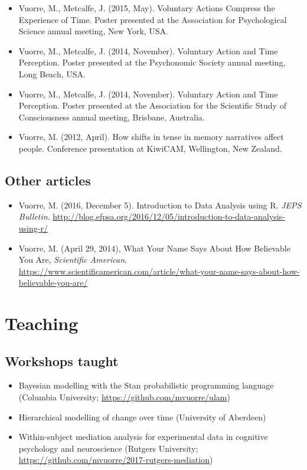 \documentclass[12pt, a4paper]{article}
\newcommand{\years}[1]{\marginnote{\scriptsize #1}}
\begin{document}
\begin{itemize}
\item Vuorre, M., Metcalfe, J. (2015, May). Voluntary Actions Compress the Experience of Time. Poster presented at the Association for Psychological Science annual meeting, New York, USA.
\item \years{2014} Vuorre, M., Metcalfe, J. (2014, November). Voluntary Action and Time Perception. Poster presented at the Psychonomic Society annual meeting, Long Beach, USA.
\item Vuorre, M., Metcalfe, J. (2014, November). Voluntary Action and Time Perception. Poster presented at the Association for the Scientific Study of Consciousness annual meeting, Brisbane, Australia.
\item \years{2012} Vuorre, M. (2012, April). How shifts in tense in memory narratives affect people. Conference presentation at KiwiCAM, Wellington, New Zealand.
\end{itemize}

\subsection*{Other articles}
\begin{itemize}
\item \years{2016} Vuorre, M. (2016, December 5). Introduction to Data Analysis using R. \emph{JEPS Bulletin}. \url{http://blog.efpsa.org/2016/12/05/introduction-to-data-analysis-using-r/}
\item \years{2014} Vuorre, M. (April 29, 2014), What Your Name Says About How Believable You Are, \emph{Scientific American}. \url{https://www.scientificamerican.com/article/what-your-name-says-about-how-believable-you-are/}
\end{itemize}

\section*{Teaching}

\subsection*{Workshops taught}
\begin{itemize}
\item \years{2019} Bayesian modelling with the Stan probabilistic programming language (Columbia University; \url{https://github.com/mvuorre/ulam})
\item \years{2018} Hierarchical modelling of change over time (University of Aberdeen)
\item \years{2017} Within-subject mediation analysis for experimental data in cognitive psychology and neuroscience (Rutgers University; \url{https://github.com/mvuorre/2017-rutgers-mediation})
\end{itemize}
\end{document}
